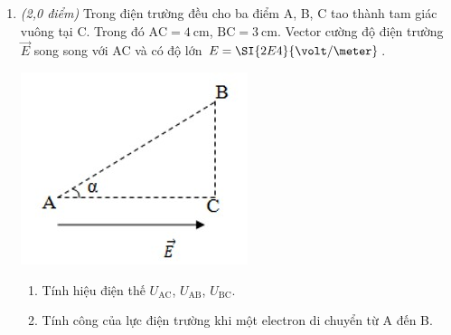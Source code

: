 \begin{enumerate}[label=\bfseries Câu \arabic*:]
\item \textit{(2,0 điểm)} Trong điện trường đều cho ba điểm A, B, C tao thành tam giác vuông tại C. Trong đó $\text{AC}=\SI{4}{\centi\meter}$, $\text{BC}=\SI{3}{\centi\meter}$. Vector cường độ điện trường $\vec{E}$ song song với AC và có độ lớn $E=\SI{2E4}{\volt/\meter}$.
\begin{center}
	\includegraphics[width=0.3\linewidth]{../figs/PH11-MidSem2-05-4}
\end{center}
\begin{enumerate}[label=\alph*)]
	\item Tính hiệu điện thế $U_\text{AC}$, $U_\text{AB}$, $U_\text{BC}$.
	\item Tính công của lực điện trường khi một electron di chuyển từ A đến B.
\end{enumerate}


\end{enumerate}
